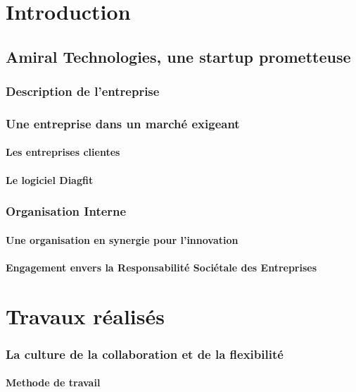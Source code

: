 \chapter{Introduction}
\section{Amiral Technologies, une startup prometteuse}
\subsection{Description de l'entreprise}


\subsection{Une entreprise dans un marché exigeant}
\subsubsection{Les entreprises clientes}

\subsubsection{Le logiciel Diagfit}


\subsection{Organisation Interne}
\subsubsection{Une organisation en synergie pour l'innovation}

\subsubsection{Engagement envers la Responsabilité Sociétale des Entreprises}




\chapter{Travaux réalisés}
\subsection{La culture de la collaboration et de la flexibilité}
\subsubsection{Methode de travail}


